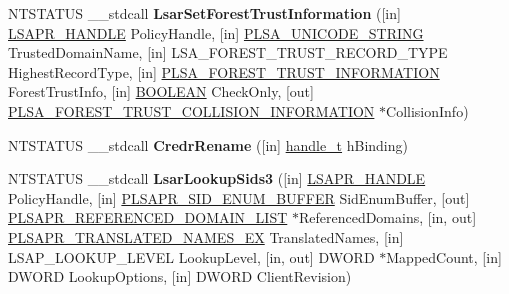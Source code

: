\begin{DoxyCompactItemize}
\item 
\mbox{\label{interfacelsarpc_a9e3dc2e9c85bd3050147be8f5e14c3dd}} 
N\+T\+S\+T\+A\+T\+US \+\_\+\+\_\+stdcall {\bfseries Lsar\+Set\+Forest\+Trust\+Information} (\mbox{[}in\mbox{]} \hyperlink{interfacevoid}{L\+S\+A\+P\+R\+\_\+\+H\+A\+N\+D\+LE} Policy\+Handle, \mbox{[}in\mbox{]} \hyperlink{struct___l_s_a___u_n_i_c_o_d_e___s_t_r_i_n_g}{P\+L\+S\+A\+\_\+\+U\+N\+I\+C\+O\+D\+E\+\_\+\+S\+T\+R\+I\+NG} Trusted\+Domain\+Name, \mbox{[}in\mbox{]} L\+S\+A\+\_\+\+F\+O\+R\+E\+S\+T\+\_\+\+T\+R\+U\+S\+T\+\_\+\+R\+E\+C\+O\+R\+D\+\_\+\+T\+Y\+PE Highest\+Record\+Type, \mbox{[}in\mbox{]} \hyperlink{struct___l_s_a___f_o_r_e_s_t___t_r_u_s_t___i_n_f_o_r_m_a_t_i_o_n}{P\+L\+S\+A\+\_\+\+F\+O\+R\+E\+S\+T\+\_\+\+T\+R\+U\+S\+T\+\_\+\+I\+N\+F\+O\+R\+M\+A\+T\+I\+ON} Forest\+Trust\+Info, \mbox{[}in\mbox{]} \hyperlink{_processor_bind_8h_a112e3146cb38b6ee95e64d85842e380a}{B\+O\+O\+L\+E\+AN} Check\+Only, \mbox{[}out\mbox{]} \hyperlink{struct___l_s_a___f_o_r_e_s_t___t_r_u_s_t___c_o_l_l_i_s_i_o_n___i_n_f_o_r_m_a_t_i_o_n}{P\+L\+S\+A\+\_\+\+F\+O\+R\+E\+S\+T\+\_\+\+T\+R\+U\+S\+T\+\_\+\+C\+O\+L\+L\+I\+S\+I\+O\+N\+\_\+\+I\+N\+F\+O\+R\+M\+A\+T\+I\+ON} $\ast$Collision\+Info)
\item 
\mbox{\label{interfacelsarpc_a3ba45159894d49c2db035cfe5a134e53}} 
N\+T\+S\+T\+A\+T\+US \+\_\+\+\_\+stdcall {\bfseries Credr\+Rename} (\mbox{[}in\mbox{]} \hyperlink{interfacevoid}{handle\+\_\+t} h\+Binding)
\item 
\mbox{\label{interfacelsarpc_a2033e1c6898dab3ac2ae89a47ac94ac2}} 
N\+T\+S\+T\+A\+T\+US \+\_\+\+\_\+stdcall {\bfseries Lsar\+Lookup\+Sids3} (\mbox{[}in\mbox{]} \hyperlink{interfacevoid}{L\+S\+A\+P\+R\+\_\+\+H\+A\+N\+D\+LE} Policy\+Handle, \mbox{[}in\mbox{]} \hyperlink{struct___l_s_a_p_r___s_i_d___e_n_u_m___b_u_f_f_e_r}{P\+L\+S\+A\+P\+R\+\_\+\+S\+I\+D\+\_\+\+E\+N\+U\+M\+\_\+\+B\+U\+F\+F\+ER} Sid\+Enum\+Buffer, \mbox{[}out\mbox{]} \hyperlink{struct___l_s_a_p_r___r_e_f_e_r_e_n_c_e_d___d_o_m_a_i_n___l_i_s_t}{P\+L\+S\+A\+P\+R\+\_\+\+R\+E\+F\+E\+R\+E\+N\+C\+E\+D\+\_\+\+D\+O\+M\+A\+I\+N\+\_\+\+L\+I\+ST} $\ast$Referenced\+Domains, \mbox{[}in, out\mbox{]} \hyperlink{struct___l_s_a_p_r___t_r_a_n_s_l_a_t_e_d___n_a_m_e_s___e_x}{P\+L\+S\+A\+P\+R\+\_\+\+T\+R\+A\+N\+S\+L\+A\+T\+E\+D\+\_\+\+N\+A\+M\+E\+S\+\_\+\+EX} Translated\+Names, \mbox{[}in\mbox{]} L\+S\+A\+P\+\_\+\+L\+O\+O\+K\+U\+P\+\_\+\+L\+E\+V\+EL Lookup\+Level, \mbox{[}in, out\mbox{]} D\+W\+O\+RD $\ast$Mapped\+Count, \mbox{[}in\mbox{]} D\+W\+O\+RD Lookup\+Options, \mbox{[}in\mbox{]} D\+W\+O\+RD Client\+Revision)

\end{DoxyCompactItemize}
